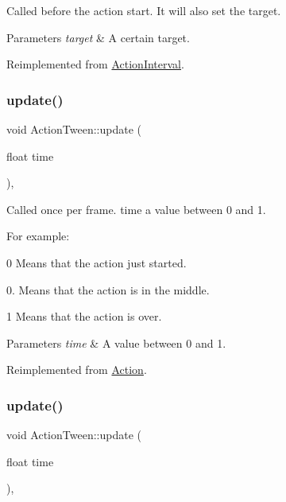 Called before the action start. It will also set the target.


\begin{DoxyParams}{Parameters}
{\em target} & A certain target. \\
\hline
\end{DoxyParams}


Reimplemented from \hyperlink{classActionInterval_ad3d91186b2c3108488ddbbdbbd982484}{Action\+Interval}.

\mbox{\label{classActionTween_a57ff5b74c67554251c0294192d56d744}} 
\subsubsection{\texorpdfstring{update()}{update()}\hspace{0.1cm}{\footnotesize\ttfamily [1/2]}}
{\footnotesize\ttfamily void Action\+Tween\+::update (\begin{DoxyParamCaption}\item[{float}]{time }\end{DoxyParamCaption})\hspace{0.3cm}{\ttfamily [override]}, {\ttfamily [virtual]}}

Called once per frame. time a value between 0 and 1.

For example\+:
\begin{DoxyItemize}
\item 0 Means that the action just started.
\item 0. Means that the action is in the middle.
\item 1 Means that the action is over.
\end{DoxyItemize}


\begin{DoxyParams}{Parameters}
{\em time} & A value between 0 and 1. \\
\hline
\end{DoxyParams}


Reimplemented from \hyperlink{classAction_a937e646e63915e33ad05ba149bfcf239}{Action}.

\mbox{\label{classActionTween_a57ff5b74c67554251c0294192d56d744}} 
\subsubsection{\texorpdfstring{update()}{update()}\hspace{0.1cm}{\footnotesize\ttfamily [2/2]}}
{\footnotesize\ttfamily void Action\+Tween\+::update (\begin{DoxyParamCaption}\item[{float}]{time }\end{DoxyParamCaption})\hspace{0.3cm}{\ttfamily [override]}, {\ttfamily [virtual]}}

